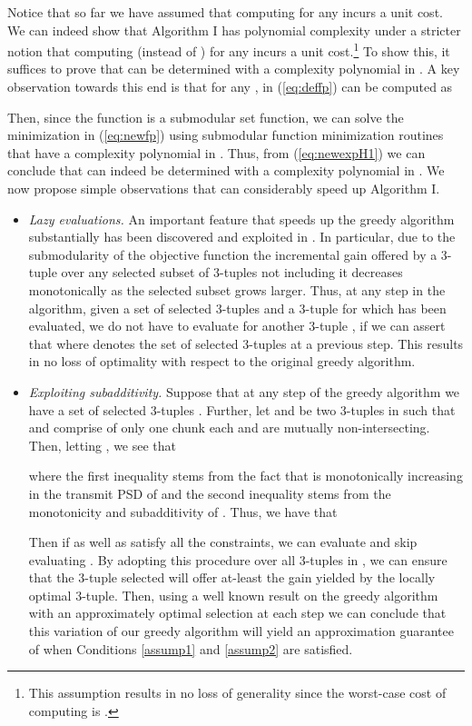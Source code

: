 \documentclass[11pt] {article}
\begin{document}
 Notice that so far we have  assumed that computing  for any  incurs a unit cost. We can indeed show that Algorithm I has polynomial complexity under a stricter notion that computing  (instead of ) for any  incurs a unit cost.\footnote{This assumption results in no loss of generality  since the worst-case cost of computing  is .} To show this, it suffices to prove that  can be determined with a complexity
polynomial in .  A key observation towards this end is that for any ,  in (\ref{eq:deffp})  can be computed as

Then, since the function  is a submodular set function, we can  solve the minimization in (\ref{eq:newfp}) using submodular function minimization routines that have a complexity polynomial in  \cite{iwata:submin}.
Thus, from (\ref{eq:newexpH1}) we can conclude that  can indeed be determined with a complexity
polynomial in .
We now propose simple observations that can considerably speed up Algorithm I.
\begin{itemize}
\item {\em Lazy evaluations.} An important feature that speeds up the greedy algorithm substantially has been discovered and exploited in \cite{Minoux:greedy,krause:greedy}. In particular, due to the submodularity  of the objective function the incremental gain offered by a 3-tuple over any selected subset of 3-tuples not including it decreases monotonically as the selected subset grows larger.
    Thus, at any step in the algorithm, given a set of selected 3-tuples  and a 3-tuple  for which  has been evaluated, we do not have to evaluate  for another 3-tuple , if we can assert that  where  denotes the set of selected 3-tuples at a previous step. This results in no loss of optimality with respect to the original greedy algorithm.




\item {\em Exploiting subadditivity.}
Suppose that at any step of the greedy algorithm  we have a set of selected 3-tuples .
 Further, let  and   be two 3-tuples in  such that  and  comprise of only one chunk each and are mutually non-intersecting. Then, letting , we see that
 
   where the first inequality stems from the fact that  is monotonically increasing in the transmit PSD of   and the second inequality stems from the monotonicity and subadditivity of . Thus, we have that
   
 Then if   as well as  satisfy all the constraints,
  we can evaluate  and skip evaluating . By adopting this procedure over all 3-tuples in   , we can ensure that the 3-tuple selected will offer at-least  the gain yielded by the locally optimal 3-tuple. Then, using a well known result on the greedy algorithm with an approximately optimal selection at each step \cite{nemhaus:analysis} we can conclude that this variation of our greedy algorithm will yield an approximation guarantee of
  when Conditions \ref{assump1} and \ref{assump2} are satisfied.
\end{itemize}
\end{document}
